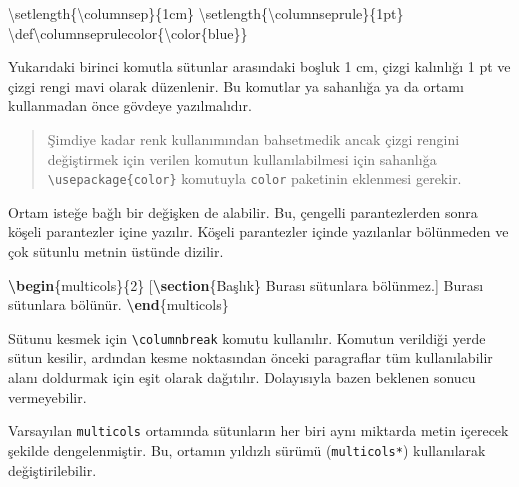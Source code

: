 \documentclass[
  10pt,
]{scrbook}
\newenvironment{Shaded}{}{}
\newcommand{\ExtensionTok}[1]{#1}
\newcommand{\FunctionTok}[1]{\textcolor[rgb]{0.02,0.16,0.49}{#1}}
\newcommand{\KeywordTok}[1]{\textcolor[rgb]{0.00,0.44,0.13}{\textbf{#1}}}
\newcommand{\NormalTok}[1]{#1}
\theoremstyle{definition}
\theoremstyle{definition}
\theoremstyle{definition}
\theoremstyle{definition}
\theoremstyle{remark}
\begin{document}
\begin{Shaded}
\begin{Highlighting}[]
\FunctionTok{\textbackslash{}setlength}\NormalTok{\{}\FunctionTok{\textbackslash{}columnsep}\NormalTok{\}\{1cm\}}
\FunctionTok{\textbackslash{}setlength}\NormalTok{\{}\FunctionTok{\textbackslash{}columnseprule}\NormalTok{\}\{1pt\}}
\FunctionTok{\textbackslash{}def\textbackslash{}columnseprulecolor}\NormalTok{\{}\FunctionTok{\textbackslash{}color}\NormalTok{\{blue\}\}}
\end{Highlighting}
\end{Shaded}

Yukarıdaki birinci komutla sütunlar arasındaki boşluk 1 cm, çizgi kalınlığı 1 pt ve çizgi rengi mavi olarak düzenlenir. Bu komutlar ya sahanlığa ya da ortamı kullanmadan önce gövdeye yazılmalıdır.

\begin{quote}
Şimdiye kadar renk kullanımından bahsetmedik ancak çizgi rengini değiştirmek için verilen komutun kullanılabilmesi için sahanlığa \texttt{\textbackslash{}usepackage\{color\}} komutuyla \texttt{color} paketinin eklenmesi gerekir.
\end{quote}

Ortam isteğe bağlı bir değişken de alabilir. Bu, çengelli parantezlerden sonra köşeli parantezler içine yazılır. Köşeli parantezler içinde yazılanlar bölünmeden ve çok sütunlu metnin üstünde dizilir.

\begin{Shaded}
\begin{Highlighting}[]
\KeywordTok{\textbackslash{}begin}\NormalTok{\{}\ExtensionTok{multicols}\NormalTok{\}\{2\}}
\NormalTok{ [}\KeywordTok{\textbackslash{}section}\NormalTok{\{Başlık\}}
\NormalTok{ Burası sütunlara bölünmez.]}
\NormalTok{ Burası sütunlara bölünür.}
\KeywordTok{\textbackslash{}end}\NormalTok{\{}\ExtensionTok{multicols}\NormalTok{\}}
\end{Highlighting}
\end{Shaded}

Sütunu kesmek için \texttt{\textbackslash{}columnbreak} komutu kullanılır. Komutun verildiği yerde sütun kesilir, ardından kesme noktasından önceki paragraflar tüm kullanılabilir alanı doldurmak için eşit olarak dağıtılır. Dolayısıyla bazen beklenen sonucu vermeyebilir.

Varsayılan \texttt{multicols} ortamında sütunların her biri aynı miktarda metin içerecek şekilde dengelenmiştir. Bu, ortamın yıldızlı sürümü (\texttt{multicols*}) kullanılarak değiştirilebilir.
\end{document}

